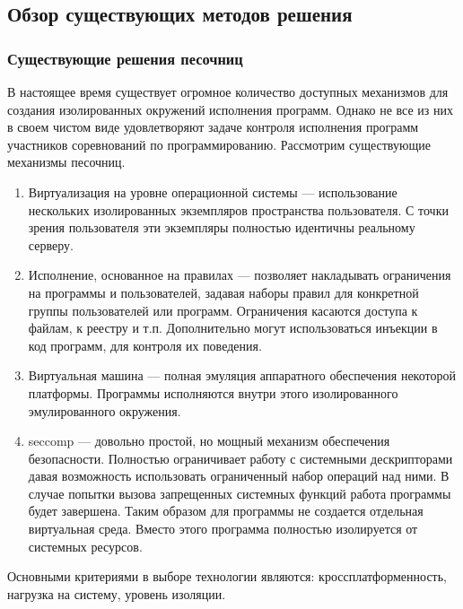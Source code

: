 \documentclass{imcs}
\begin{document}
\subsection{Обзор существующих методов решения}

\subsubsection{Существующие решения песочниц}
В настоящее время существует огромное количество доступных механизмов для создания изолированных окружений исполнения программ. Однако не все из них в своем чистом виде удовлетворяют задаче контроля исполнения программ участников соревнований по программированию.
Рассмотрим существующие механизмы песочниц.

\begin{enumerate}
  \item Виртуализация на уровне операционной системы --- использование нескольких изолированных экземпляров пространства пользователя. С точки зрения пользователя эти экземпляры полностью идентичны реальному серверу\cite{virtualization}.
  \item Исполнение, основанное на правилах --- позволяет накладывать ограничения на программы и пользователей, задавая наборы правил для конкретной группы пользователей или программ. Ограничения касаются доступа к файлам, к реестру и т.п. Дополнительно могут использоваться инъекции в код программ, для контроля их поведения.
  \item Виртуальная машина --- полная эмуляция аппаратного обеспечения некоторой платформы. Программы исполняются внутри этого изолированного эмулированного окружения.
  \item seccomp\cite{seccomp} --- довольно простой, но мощный механизм обеспечения безопасности. Полностью ограничивает работу с системными дескрипторами давая возможность использовать ограниченный набор операций над ними. В случае попытки вызова запрещенных системных функций работа программы будет завершена. Таким образом для программы не создается отдельная виртуальная среда. Вместо этого программа полностью изолируется от системных ресурсов.
\end{enumerate}

Основными критериями в выборе технологии являются: кроссплатформенность, нагрузка на систему, уровень изоляции.
\end{document}
